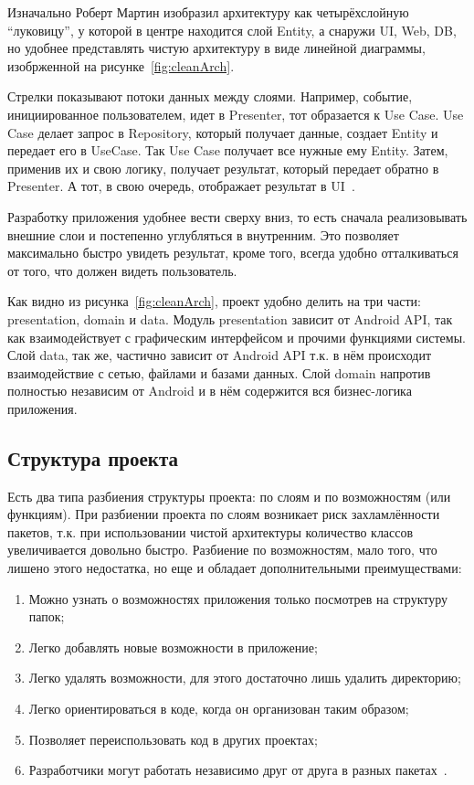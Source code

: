 Изначально Роберт Мартин изобразил архитектуру как четырёхслойную ``луковицу'', у которой в центре находится слой Entity, а снаружи UI, Web, DB, но удобнее представлять чистую архитектуру в виде линейной диаграммы, изобрженной на рисунке~\ref{fig:cleanArch}.

Стрелки показывают потоки данных между слоями.
Например, событие, инициированное пользователем, идет в Presenter, тот образается к Use Case.
Use Case делает запрос в Repository, который получает данные, создает Entity и передает его в UseCase.
Так Use Case получает все нужные ему Entity.
Затем, применив их и свою логику, получает результат, который передает обратно в Presenter.
А тот, в свою очередь, отображает результат в UI~\cite{habr:clean}.

Разработку приложения удобнее вести сверху вниз, то есть сначала реализовывать внешние слои и постепенно углубляться в внутренним.
Это позволяет максимально быстро увидеть результат, кроме того, всегда удобно отталкиваться от того, что должен видеть пользователь.

Как видно из рисунка~\ref{fig:cleanArch}, проект удобно делить на три части: presentation, domain и data.
Модуль presentation зависит от Android API, так как взаимодействует с графическим интерфейсом и прочими функциями системы.
Слой data, так же, частично зависит от Android API т.к. в нём происходит взаимодействие с сетью, файлами и базами данных.
Слой domain напротив полностью независим от Android и в нём содержится вся бизнес-логика приложения.

\subsection{Структура проекта}
\label{subsec:struct}

Есть два типа разбиения структуры проекта: по слоям и по возможностям (или функциям).
При разбиении проекта по слоям возникает риск захламлённости пакетов, т.к. при использовании чистой архитектуры количество классов увеличивается довольно быстро.
Разбиение по возможностям, мало того, что лишено этого недостатка, но еще и обладает дополнительными преимуществами:
\begin{enumerate}
  \item Можно узнать о возможностях приложения только посмотрев на структуру папок;
  \item Легко добавлять новые возможности в приложение;
  \item Легко удалять возможности, для этого достаточно лишь удалить директорию;
  \item Легко ориентироваться в коде, когда он организован таким образом;
  \item Позволяет переиспользовать код в других проектах;
  \item Разработчики могут работать независимо друг от друга в разных пакетах~\cite{medium:pbf}.
\end{enumerate}

